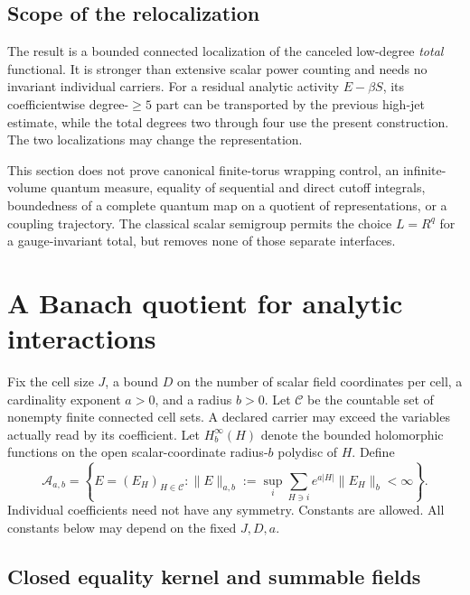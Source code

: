 \documentclass[11pt]{article}
\theoremstyle{remark}
\begin{document}
\subsection{Scope of the relocalization}
\label{lst-scope}

The result is a bounded connected localization of
the canceled low-degree \emph{total} functional.
It is stronger than extensive scalar power counting
and needs no invariant individual carriers. For a
residual analytic activity \(E-\beta S\), its
coefficientwise degree-\(\ge5\) part can be transported
by the previous high-jet estimate, while the total
degrees two through four use the present construction.
The two localizations may change the representation.

This section does not prove canonical finite-torus
wrapping control, an infinite-volume quantum measure,
equality of sequential and direct cutoff integrals,
boundedness of a complete quantum map on a quotient
of representations, or a coupling trajectory.
The classical scalar semigroup permits the choice
\(L=R^q\) for a gauge-invariant total, but removes
none of those separate interfaces.

\section{A Banach quotient for analytic interactions}
\label{aqb-section}

Fix the cell size $J$, a bound $D$ on the number of scalar field
coordinates per cell, a cardinality exponent $a>0$, and a radius
$b>0$. Let $\mathcal C$ be the countable set of nonempty finite
connected cell sets. A declared carrier may exceed the variables
actually read by its coefficient. Let $H^\infty_b(H)$ denote the
bounded holomorphic functions on the open scalar-coordinate
radius-$b$ polydisc of $H$. Define
\begin{equation}
 \mathcal A_{a,b}=\left\{E=(E_H)_{H\in\mathcal C}:
 \|E\|_{a,b}:=\sup_i\sum_{H\ni i}e^{a|H|}
                       \|E_H\|_b<\infty\right\}.
 \label{aqb-activity-space}
\end{equation}
Individual coefficients need not have any symmetry. Constants
are allowed. All constants below may depend on the fixed $J,D,a$.

\subsection{Closed equality kernel and summable fields}
\label{aqb-quotient-section}
\end{document}
